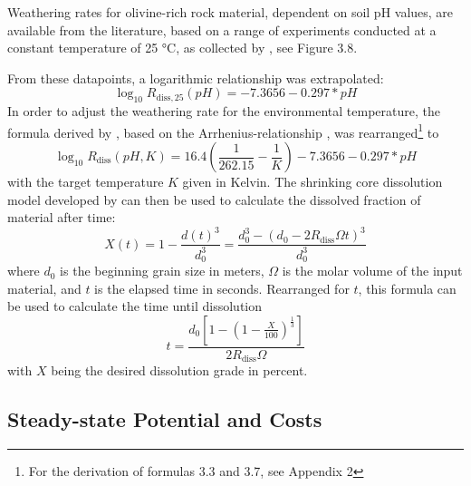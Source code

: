 Weathering rates for olivine-rich rock material, dependent on soil pH values, are available from the literature, based on a range of experiments conducted at a constant temperature of 25 °C, as collected by \textcite{hangx_coastal_2009}, see Figure 3.8.

From these datapoints, a logarithmic relationship was extrapolated:
\begin{equation}
  \log_{10}{R_{{\text{diss}}, 25}(pH)} = -7.3656 - 0.297 * pH
\end{equation}
In order to adjust the weathering rate for the environmental temperature, the formula derived by \textcite{wogelius_olivine_1992}, based on the Arrhenius-relationship  \parencite{arrhenius_uber_1889}, was rearranged\footnote{For the derivation of formulas 3.3 and 3.7, see Appendix 2} to
\begin{equation}
  \log_{10}{R_{\text{diss}}(pH, K)} = 16.4\left(\frac{1}{262.15}-\frac{1}{K}\right)-7.3656 - 0.297*pH
\end{equation}
with the target temperature \(K\) given in Kelvin.
The shrinking core dissolution model developed by \textcite{hangx_coastal_2009} can then be used to calculate the dissolved fraction of material after time:
\begin{equation}
  X(t) = 1-\frac{d(t)^3}{d_0^3} = \frac{d_0^3-(d_0-2R_{\text{diss}}\Omega t)^3}{d_0^3}
\end{equation}
where \(d_0\) is the beginning grain size in meters, \(\Omega\) is the molar volume of the input material, and \(t\) is the elapsed time in seconds. Rearranged for \(t\), this formula can be used to calculate the time until dissolution
\begin{equation}
  t = \frac{d_0[1-(1-\frac{X}{100})^\frac{1}{3}]}{2R_{\text{diss}}\Omega}
\end{equation}
with \(X\) being the desired dissolution grade in percent.
\subsection{Steady-state Potential and Costs}
